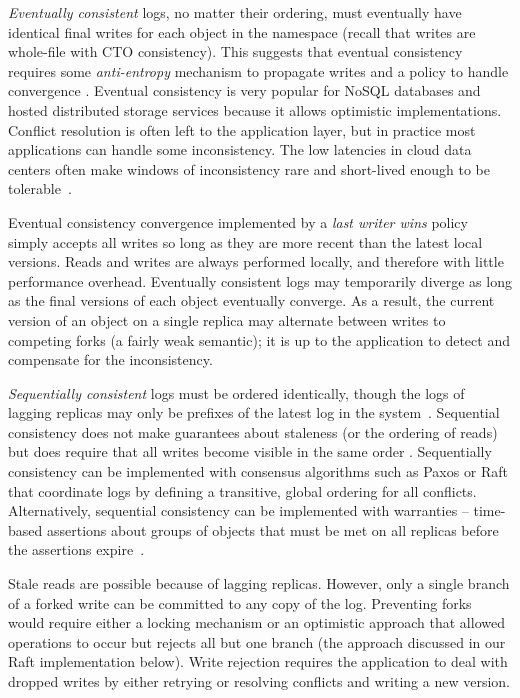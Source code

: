 \documentclass[10pt,conference,letterpaper]{IEEEtran}
\begin{document}
\emph{Eventually consistent} logs, no matter their ordering, must eventually have identical final
writes for each object in the namespace (recall that writes are whole-file with CTO consistency).
This suggests that eventual consistency requires some \textit{anti-entropy} mechanism to
propagate writes and a policy to handle convergence \cite{terry_managing_1995}.
Eventual consistency is very popular for NoSQL databases and hosted distributed storage
services \cite{decandia_dynamo:_2007,lakshman_cassandra:_2010} because it allows
optimistic implementations.
Conflict resolution is often left to the application layer, but
in practice most applications can handle some inconsistency.
The low latencies in cloud data centers often make windows of
inconsistency rare and
short-lived enough to be tolerable~\cite{bailis_quantifying_2014}.

Eventual consistency convergence implemented by a \textit{last writer wins} policy simply accepts all
writes so long as they are more recent than the latest local versions.
Reads and writes are always performed locally, and therefore with little
performance overhead.
Eventually consistent logs may temporarily diverge as long as the final versions of each
object eventually converge.
As a result, the current version of an object on a single replica may alternate between writes to competing
forks (a fairly weak semantic); it is up to the application to detect and compensate for the
inconsistency.

\emph{Sequentially consistent} logs must be ordered identically, though the logs of
lagging replicas may only be prefixes of the latest log in the system~\cite{attiya_sequential_1994}.
Sequential consistency does not make guarantees about staleness
(or the ordering of reads) but does require that all writes become visible in the same
order \cite{bermbach_consistency_2013}.
Sequentially consistency can be implemented with consensus algorithms such as Paxos
\cite{lamport_fast_2006} or Raft \cite{ongaro_search_2014} that coordinate logs by
defining a transitive, global ordering for all conflicts.
Alternatively, sequential consistency can be implemented with warranties -- time-based
assertions about groups of objects that must be met on all replicas before the assertions
expire~\cite{liu_warranties_2014}.

Stale reads are possible because of lagging replicas.
However, only a single branch of a forked write can be committed to any copy of the log.
Preventing forks would require either a locking mechanism or an optimistic approach that
allowed operations to occur but rejects all but one branch (the approach discussed in our
Raft implementation below).
Write rejection requires the application to deal with dropped writes by either retrying or
resolving conflicts and writing a new version.
\end{document}
